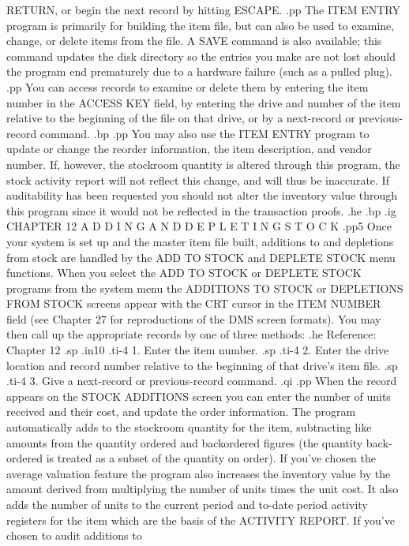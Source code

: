 RETURN, or begin the next record by hitting ESCAPE.
.pp
The ITEM ENTRY program is primarily for building the item file, but
can also be used to examine, change, or delete items from the file.  A SAVE
command is also available; this command updates the disk directory
so the entries you make are not lost should the program end prematurely
due to a hardware failure (such as a pulled plug).
.pp
You can access records to examine or delete them by entering the
item number in the ACCESS KEY field, by entering the drive and number
of the item relative to the beginning of the file
on that drive, or by a next-record
or previous-record command.
.bp
.pp
You may also use the ITEM ENTRY program to update or change the reorder
information, the item description, and vendor number.  If, however, the
stockroom quantity is altered through this program, the stock activity
report will not reflect this change, and will thus be inaccurate.  If
auditability has been requested you should not alter the inventory value
through this program since it would not be reflected in the transaction
proofs.
.he
.bp
.ig
CHAPTER 12
A D D I N G   A N D   D E P L E T I N G    S T O C K
.pp5
Once your system is set up and the master item file built, additions
to and depletions from stock are handled by the ADD TO STOCK and
DEPLETE STOCK menu functions.  When you select the ADD TO STOCK or
DEPLETE STOCK programs from the system menu the ADDITIONS TO STOCK
or DEPLETIONS FROM STOCK screens appear with the CRT cursor in the
ITEM NUMBER field (see Chapter 27 for reproductions of the DMS screen
formats).  You may then call up the appropriate records by one of three
methods:
.he Reference: Chapter 12
.sp
.in10
.ti-4
1.  Enter the item number.
.sp
.ti-4
2.  Enter the drive location and record number relative to the beginning
of that drive's item file.
.sp
.ti-4
3.  Give a next-record or previous-record command.
.qi
.pp
When the record appears on the STOCK ADDITIONS screen you can enter the
number of units received and their cost, and update the order information.
The program automatically adds to the stockroom quantity for the item,
subtracting like amounts from the quantity ordered and backordered
figures (the quantity back-ordered is treated as a subset of the quantity
on order).  If you've chosen the average valuation feature the program also
increases the inventory value by the amount derived from multiplying the
number of units times the unit cost.  It also adds the number of units to the
current period and to-date period activity registers for the item which are
the basis of the ACTIVITY REPORT.  If you've chosen to audit additions to
